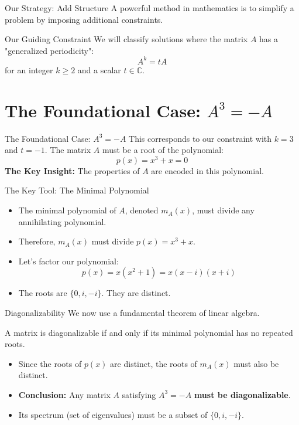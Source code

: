 \documentclass{beamer}
\begin{document}
\begin{frame}{Our Strategy: Add Structure}
  A powerful method in mathematics is to simplify a problem by imposing additional constraints.
  \vfill %
  \begin{alertblock}{Our Guiding Constraint}
  We will classify solutions where the matrix $A$ has a "generalized periodicity":
  \[ A^k = tA \]
    for an integer $k \ge 2$ and a scalar $t \in \mathbb{C}$.
  \end{alertblock}
\end{frame}

\section{The Foundational Case: $A^3 = -A$}

\begin{frame}{The Foundational Case: $A^3 = -A$}
  This corresponds to our constraint with $k=3$ and $t=-1$.
  \vfill
  The matrix $A$ must be a root of the polynomial:
  \[ p(x) = x^3 + x = 0 \]
  \vfill
  \textbf{The Key Insight:} The properties of $A$ are encoded in this polynomial.
\end{frame}

\begin{frame}{The Key Tool: The Minimal Polynomial}
  \begin{itemize}
    \item The minimal polynomial of $A$, denoted $m_A(x)$, must divide any annihilating polynomial.
    \item Therefore, $m_A(x)$ must divide $p(x) = x^3 + x$.
    \pause %
    \item Let's factor our polynomial:
    \[ p(x) = x(x^2 + 1) = x(x-i)(x+i) \]
    \pause
    \item The roots are $\{0, i, -i\}$. They are distinct.
  \end{itemize}
\end{frame}

\begin{frame}{Diagonalizability}
  We now use a fundamental theorem of linear algebra.
  \begin{theorem}
    A matrix is diagonalizable if and only if its minimal polynomial has no repeated roots.
  \end{theorem}
  \vfill
  \begin{itemize}
    \item Since the roots of $p(x)$ are distinct, the roots of $m_A(x)$ must also be distinct.
    \pause
    \item \textbf{Conclusion:} Any matrix $A$ satisfying $A^3 = -A$ \textbf{must be diagonalizable}.
    \item Its spectrum (set of eigenvalues) must be a subset of $\{0, i, -i\}$.
  \end{itemize}
\end{frame}
\end{document}
